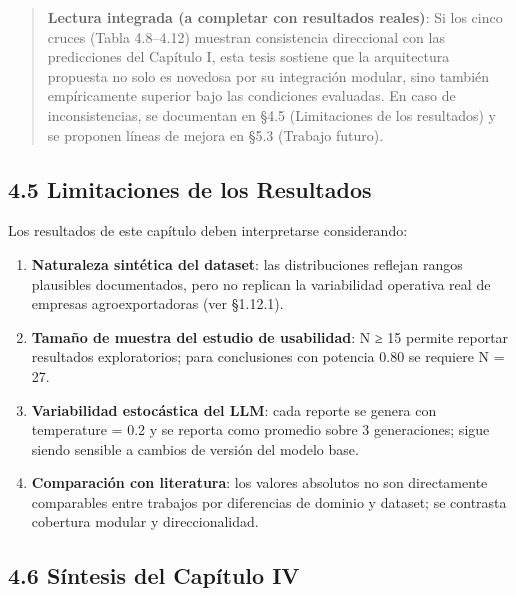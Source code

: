 \begin{quote}
\textbf{Lectura integrada (a completar con resultados reales)}: Si los
cinco cruces (Tabla 4.8--4.12) muestran consistencia direccional con las
predicciones del Capítulo I, esta tesis sostiene que la arquitectura
propuesta no solo es novedosa por su integración modular, sino también
empíricamente superior bajo las condiciones evaluadas. En caso de
inconsistencias, se documentan en §4.5 (Limitaciones de los resultados)
y se proponen líneas de mejora en §5.3 (Trabajo futuro).
\end{quote}

\subsection{4.5 Limitaciones de los
Resultados}\label{limitaciones-de-los-resultados}

Los resultados de este capítulo deben interpretarse considerando:

\begin{enumerate}
\def\labelenumi{\arabic{enumi}.}
\tightlist
\item
  \textbf{Naturaleza sintética del dataset}: las distribuciones reflejan
  rangos plausibles documentados, pero no replican la variabilidad
  operativa real de empresas agroexportadoras (ver §1.12.1).
\item
  \textbf{Tamaño de muestra del estudio de usabilidad}: N ≥ 15 permite
  reportar resultados exploratorios; para conclusiones con potencia 0.80
  se requiere N = 27.
\item
  \textbf{Variabilidad estocástica del LLM}: cada reporte se genera con
  temperature = 0.2 y se reporta como promedio sobre 3 generaciones;
  sigue siendo sensible a cambios de versión del modelo base.
\item
  \textbf{Comparación con literatura}: los valores absolutos no son
  directamente comparables entre trabajos por diferencias de dominio y
  dataset; se contrasta cobertura modular y direccionalidad.
\end{enumerate}

\subsection{4.6 Síntesis del Capítulo
IV}\label{suxedntesis-del-capuxedtulo-iv}

